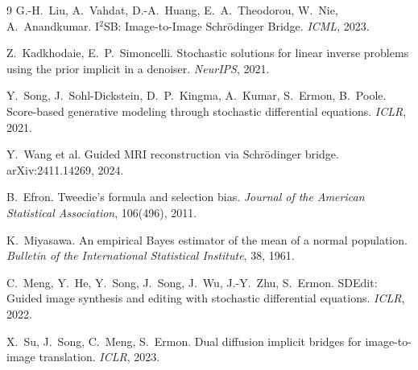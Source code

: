 \documentclass[11pt]{article}
\theoremstyle{definition}
\theoremstyle{remark}
\begin{document}
\begin{thebibliography}{9}
G.-H.~Liu, A.~Vahdat, D.-A.~Huang, E.~A.~Theodorou, W.~Nie, A.~Anandkumar.
I$^2$SB: Image-to-Image Schr\"odinger Bridge. \emph{ICML}, 2023.

Z.~Kadkhodaie, E.~P.~Simoncelli. Stochastic solutions for linear inverse problems using the
prior implicit in a denoiser. \emph{NeurIPS}, 2021.

Y.~Song, J.~Sohl-Dickstein, D.~P.~Kingma, A.~Kumar, S.~Ermon, B.~Poole. Score-based generative
modeling through stochastic differential equations. \emph{ICLR}, 2021.

Y.~Wang et al. Guided MRI reconstruction via Schr\"odinger bridge. arXiv:2411.14269, 2024.

B.~Efron. Tweedie's formula and selection bias.
\emph{Journal of the American Statistical Association}, 106(496), 2011.

K.~Miyasawa. An empirical Bayes estimator of the mean of a normal population.
\emph{Bulletin of the International Statistical Institute}, 38, 1961.

C.~Meng, Y.~He, Y.~Song, J.~Song, J.~Wu, J.-Y.~Zhu, S.~Ermon. SDEdit: Guided image synthesis
and editing with stochastic differential equations. \emph{ICLR}, 2022.

X.~Su, J.~Song, C.~Meng, S.~Ermon. Dual diffusion implicit bridges for image-to-image
translation. \emph{ICLR}, 2023.
\end{thebibliography}
\end{document}
